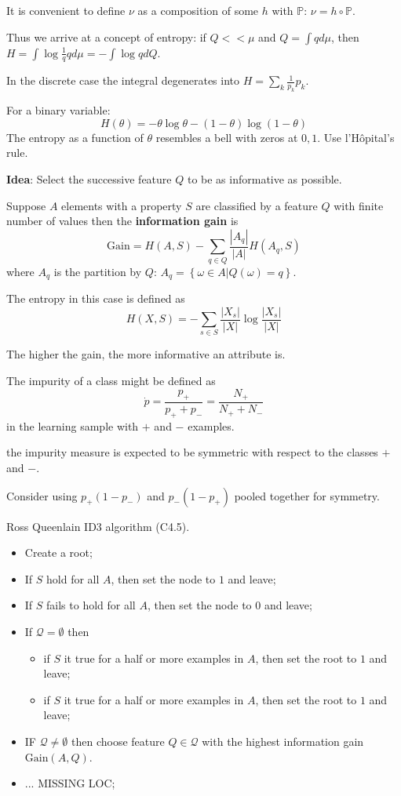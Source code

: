\documentclass[a4paper]{article}
\newcommand{\obj}[1]{{\left\{ #1 \right \}}}
\newcommand{\induc}[1]{{\left . #1 \right \vert}}
\newcommand{\abs}[1]{{\left | #1 \right |}}
\newcommand{\pr}{\mathbb{P}}
\begin{document}
It is convenient to define $\nu$ as a composition of some $h$ with $\pr$: $\nu = h\circ \pr$.

Thus we arrive at a concept of entropy: if $Q<<\mu$ and $Q=\int q d\mu$, then $H = \int \log \frac{1}{q} q d\mu = - \int \log q dQ$.

In the discrete case the integral degenerates into $H = \sum_k \frac{1}{p_k} p_k$.

For a binary variable:
\[H(\theta) = - \theta \log \theta - (1-\theta) \log (1-\theta)\]
The entropy as a function of $\theta$ resembles a bell with zeros at $0,1$. Use l'H\^opital's rule.

\textbf{Idea}: Select the successive feature $Q$ to be as informative as possible.

Suppose $A$ elements with a property $S$ are classified by a feature $Q$ with finite number of values then the \textbf{information gain} is
\[\text{Gain} = H(A,S) - \sum_{q\in Q} \frac{\abs{A_q}}{\abs{A}} H(A_q,S)\]
where $A_q$ is the partition by $Q$: $A_q = \obj{\induc{\omega \in A} Q(\omega)=q }$.

The entropy in this case is defined as 
\[H(X,S) = - \sum_{s\in S} \frac{\abs{X_s}}{\abs{X}} \log \frac{\abs{X_s}}{\abs{X}}\]

The higher the gain, the more informative an attribute is.

The impurity of a class might be defined as
\[\dot{p} = \frac{p_+}{p_++p_-} = \frac{N_+}{N_+ + N_-}\]
in the learning sample with $+$ and $-$ examples.

the impurity measure is expected to be symmetric with respect to the classes $+$ and $-$.

Consider using $p_+(1-p_-)$ and $p_-(1-p_+)$ pooled together for symmetry.

Ross Queenlain ID3 algorithm (C4.5).
\begin{itemize}
	\item Create a root;
	\item If $S$ hold for all $A$, then set the node to $1$ and leave;
	\item If $S$ fails to hold for all $A$, then set the node to $0$ and leave;
	\item If $\mathcal{Q} = \emptyset$ then \begin{itemize}
		\item if $S$ it true for a half or more examples in $A$, then set the root to $1$ and leave;
		\item if $S$ it true for a half or more examples in $A$, then set the root to $1$ and leave;
	\end{itemize}
	\item IF $\mathcal{Q}\neq\emptyset$ then choose feature $Q\in \mathcal{Q}$ with the highest information gain $\text{Gain}(A, Q)$.
	\item ... MISSING LOC;
\end{itemize}
\end{document}
